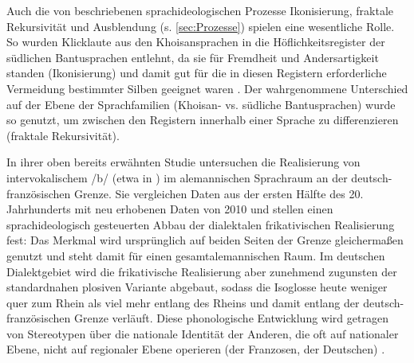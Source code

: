 Auch die von \citet{Irvine2000} beschriebenen sprachideologischen Prozesse Ikonisierung, fraktale Rekursivität und Ausblendung (s. \autoref{sec:Prozesse}) spielen eine wesentliche Rolle. 
So wurden Klicklaute aus den Khoisansprachen in die Höflichkeitsregister der südlichen Bantusprachen entlehnt, da sie für Fremdheit und Andersartigkeit standen (Ikonisierung) und damit gut für die in diesen Registern erforderliche Vermeidung bestimmter Silben geeignet waren \citep[s.][42--43]{Irvine2000}. 
Der wahrgenommene Unterschied auf der Ebene der Sprachfamilien (Khoisan- vs. südliche Bantusprachen) wurde so genutzt, um zwischen den Registern innerhalb einer Sprache zu differenzieren (fraktale Rekursivität).

In ihrer oben bereits erwähnten Studie untersuchen \citet{Auer.2017} die Realisierung von intervokalischem /b/ (etwa in ) im alemannischen Sprachraum an der deutsch-französischen Grenze. 
Sie vergleichen Daten aus der ersten Hälfte des 20. Jahrhunderts mit neu erhobenen Daten von 2010 und stellen einen sprachideologisch gesteuerten Abbau der dialektalen frikativischen Realisierung fest:
Das Merkmal wird ursprünglich auf beiden Seiten der Grenze gleichermaßen genutzt und steht damit für einen gesamtalemannischen Raum. 
Im deutschen Dialektgebiet wird die frikativische Realisierung aber zunehmend zugunsten der standardnahen plosiven Variante abgebaut, sodass die Isoglosse heute weniger quer zum Rhein als viel mehr entlang des Rheins und damit entlang der deutsch-französischen Grenze verläuft. 
Diese phonologische Entwicklung wird getragen von \glqq Stereotypen über die nationale Identität der \glq Anderen\grq, die oft auf nationaler Ebene, nicht auf regionaler Ebene operieren (\glq der Franzosen\grq, \glq der Deutschen\grq)\grqq{} \citep[41]{Auer.2017}. %

